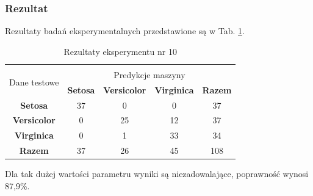 \documentclass[12pt]{article}
\begin{document}
\subsubsection{Rezultat}

Rezultaty badań eksperymentalnych przedstawione są w Tab. \ref{wyniki10}.
\begin{table}[ht!]
 \centering
 \vspace{0.2cm}
  \begin{tabular}{|*{5}{c|}}
  \hline\\[-0.5cm]
   \multirow{2}{*}{Dane testowe} & \multicolumn{4}{c|}{Predykcje maszyny} \\ \cline{2-5}
   & \textbf{Setosa} & \textbf{Versicolor} & \textbf{Virginica} & \textbf{Razem}\\
  \hline
   \textbf{Setosa} & 37 & 0 & 0 & 37  \\ \hline
   \textbf{Versicolor} & 0 & 25 & 12 & 37  \\ \hline
   \textbf{Virginica} & 0 &  1 & 33 & 34  \\ \hline
   \textbf{Razem} & 37 & 26 & 45 & 108 \\
  \hline
 \end{tabular}
 \caption{Rezultaty eksperymentu nr 10}
 \label{wyniki10}
\end{table}

\noindent Dla tak dużej wartości parametru wyniki są niezadowalające, poprawność wynosi 87,9\%.\newline
\end{document}

